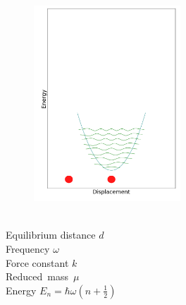 \documentclass[12pt, fleqn]{beamer}
\begin{document}
\begin{frame}
\begin{overlayarea}{\textwidth}{10cm}
{            \begin{figure}
                \includegraphics[width=5.5cm]{fc_build/step2.png}
            \end{figure}
            ~\\ 
            Equilibrium distance $d$ \\
            Frequency $\omega$ \\
            Force constant $k$ \\
            \mbox{Reduced mass $\mu$} \\
            Energy $E_n = \hbar \omega (n+\frac{1}{2})$ \\
        }
\end{overlayarea}
\end{frame}
\end{document}

